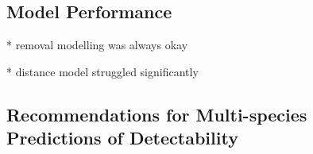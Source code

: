 \documentclass[12pt]{article}
\begin{document}
\subsection{Model Performance}

* removal modelling was always okay

* distance model struggled significantly

\subsection{Recommendations for Multi-species Predictions of Detectability}



\end{document}
